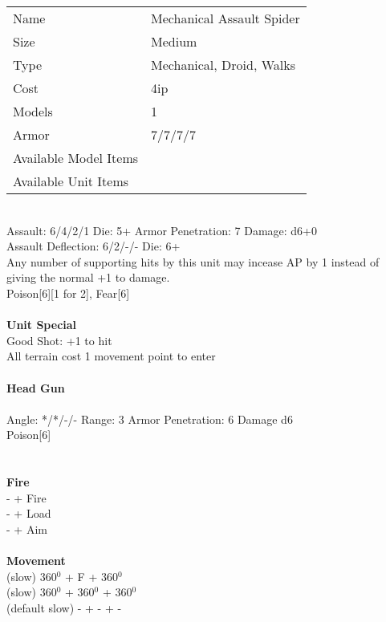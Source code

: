 \begin{tabular}{ll}
  Name & Mechanical Assault Spider \\
  Size & Medium\\
  Type & Mechanical, Droid, Walks\\
  Cost & 4ip\\
  Models & 1\\
  Armor & 7/7/7/7\\
  Available Model Items &  \\
  Available Unit Items &  \\
\end{tabular}

\ \\
Assault: 6/4/2/1 Die: 5+ Armor Penetration: 7 Damage: d6+0 \\
Assault Deflection: 6/2/-/- Die: 6+\\
\indent Any number of supporting hits by this unit may incease AP by 1 instead of giving the normal +1 to damage. \\ Poison[6][1 for 2], Fear[6]   \\
\ \\

{\bf Unit Special} \\
Good Shot: +1 to hit\\ All terrain cost 1 movement point to enter
\ \\
\ \\
{\bf Head Gun } \\
\ \\
Angle: */*/-/- Range: 3 Armor Penetration: 6 Damage d6\\ Poison[6] \\
\indent  \\





\ \\ {\bf Fire  } \\
- + Fire \\
- + Load \\
- + Aim \\
\ \\ {\bf Movement } \\
(slow) 360$^0$ + F + 360$^0$ \\
(slow) 360$^0$ + 360$^0$ + 360$^0$ \\
(default slow) - + - + - \\



